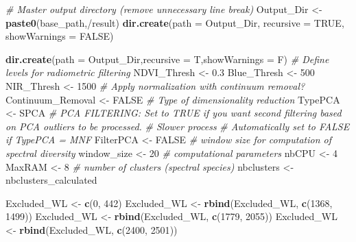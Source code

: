 \documentclass[
]{article}
\newenvironment{Shaded}{\begin{snugshade}}{\end{snugshade}}
\newcommand{\AttributeTok}[1]{\textcolor[rgb]{0.13,0.29,0.53}{#1}}
\newcommand{\CommentTok}[1]{\textcolor[rgb]{0.56,0.35,0.01}{\textit{#1}}}
\newcommand{\ConstantTok}[1]{\textcolor[rgb]{0.56,0.35,0.01}{#1}}
\newcommand{\DecValTok}[1]{\textcolor[rgb]{0.00,0.00,0.81}{#1}}
\newcommand{\FloatTok}[1]{\textcolor[rgb]{0.00,0.00,0.81}{#1}}
\newcommand{\FunctionTok}[1]{\textcolor[rgb]{0.13,0.29,0.53}{\textbf{#1}}}
\newcommand{\NormalTok}[1]{#1}
\newcommand{\OtherTok}[1]{\textcolor[rgb]{0.56,0.35,0.01}{#1}}
\newcommand{\StringTok}[1]{\textcolor[rgb]{0.31,0.60,0.02}{#1}}
\begin{document}
\begin{Shaded}
\begin{Highlighting}[]
\CommentTok{\# Master output directory (remove unnecessary line break)}
\NormalTok{Output\_Dir }\OtherTok{\textless{}{-}} \FunctionTok{paste0}\NormalTok{(base\_path,}\StringTok{\textquotesingle{}/result\textquotesingle{}}\NormalTok{)}
\FunctionTok{dir.create}\NormalTok{(}\AttributeTok{path =}\NormalTok{ Output\_Dir, }\AttributeTok{recursive =} \ConstantTok{TRUE}\NormalTok{, }\AttributeTok{showWarnings =} \ConstantTok{FALSE}\NormalTok{)}

\FunctionTok{dir.create}\NormalTok{(}\AttributeTok{path =}\NormalTok{ Output\_Dir,}\AttributeTok{recursive =}\NormalTok{ T,}\AttributeTok{showWarnings =}\NormalTok{ F)}
\CommentTok{\# Define levels for radiometric filtering}
\NormalTok{NDVI\_Thresh }\OtherTok{\textless{}{-}} \FloatTok{0.3}
\NormalTok{Blue\_Thresh }\OtherTok{\textless{}{-}} \DecValTok{500}
\NormalTok{NIR\_Thresh }\OtherTok{\textless{}{-}} \DecValTok{1500}
\CommentTok{\# Apply normalization with continuum removal?}
\NormalTok{Continuum\_Removal }\OtherTok{\textless{}{-}} \ConstantTok{FALSE}
\CommentTok{\# Type of dimensionality reduction}
\NormalTok{TypePCA }\OtherTok{\textless{}{-}} \StringTok{\textquotesingle{}SPCA\textquotesingle{}}
\CommentTok{\# PCA FILTERING:        Set to TRUE if you want second filtering based on PCA outliers to be processed.}
\CommentTok{\# Slower process}
\CommentTok{\# Automatically set to FALSE if TypePCA     = \textquotesingle{}MNF\textquotesingle{}}
\NormalTok{FilterPCA }\OtherTok{\textless{}{-}} \ConstantTok{FALSE}
\CommentTok{\# window size for computation of spectral diversity}
\NormalTok{window\_size }\OtherTok{\textless{}{-}} \DecValTok{20}
\CommentTok{\# computational parameters}
\NormalTok{nbCPU }\OtherTok{\textless{}{-}} \DecValTok{4}
\NormalTok{MaxRAM }\OtherTok{\textless{}{-}} \DecValTok{8}
\CommentTok{\# number of clusters (spectral species)}
\NormalTok{nbclusters }\OtherTok{\textless{}{-}}\NormalTok{ nbclusters\_calculated}

\NormalTok{Excluded\_WL }\OtherTok{\textless{}{-}} \FunctionTok{c}\NormalTok{(}\DecValTok{0}\NormalTok{, }\DecValTok{442}\NormalTok{)}
\NormalTok{Excluded\_WL }\OtherTok{\textless{}{-}} \FunctionTok{rbind}\NormalTok{(Excluded\_WL, }\FunctionTok{c}\NormalTok{(}\DecValTok{1368}\NormalTok{, }\DecValTok{1499}\NormalTok{))}
\NormalTok{Excluded\_WL }\OtherTok{\textless{}{-}} \FunctionTok{rbind}\NormalTok{(Excluded\_WL, }\FunctionTok{c}\NormalTok{(}\DecValTok{1779}\NormalTok{, }\DecValTok{2055}\NormalTok{))}
\NormalTok{Excluded\_WL }\OtherTok{\textless{}{-}} \FunctionTok{rbind}\NormalTok{(Excluded\_WL, }\FunctionTok{c}\NormalTok{(}\DecValTok{2400}\NormalTok{, }\DecValTok{2501}\NormalTok{))}



\end{Highlighting}
\end{Shaded}
\end{document}
